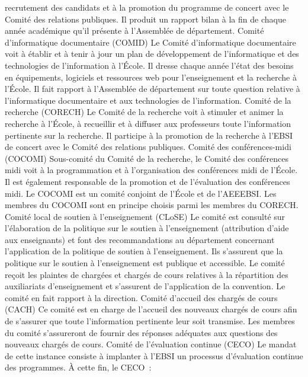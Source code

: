 \documentclass [12 pt]{article}
\begin{document}
                recrutement des candidats et à la promotion du programme de concert avec le Comité
                des relations publiques. Il produit un rapport bilan à la fin de chaque année
                académique qu'il présente à l'Assemblée de département.
            Comité d'informatique documentaire (COMID)
            Le Comité d'informatique documentaire voit à établir et à tenir à jour un plan de
                développement de l'informatique et des technologies de l'information à l'École. Il
                dresse chaque année l'état des besoins en équipements, logiciels et ressources web
                pour l'enseignement et la recherche à l'École. Il fait rapport à l'Assemblée de
                département sur toute question relative à l'informatique documentaire et aux
                technologies de l'information.
            Comité de la recherche (CORECH)
            Le Comité de la recherche voit à stimuler et animer la recherche à l'École, à
                recueillir et à diffuser aux professeurs toute l'information pertinente sur la
                recherche. Il participe à la promotion de la recherche à l'EBSI de concert avec le
                Comité des relations publiques.
            Comité des conférences-midi (COCOMI)
            Sous-comité du Comité de la recherche, le Comité des conférences midi voit à la
                programmation et à l'organisation des conférences midi de l'École. Il est également
                responsable de la promotion et de l'évaluation des conférences midi. Le COCOMI est
                un comité conjoint de l'École et de l'AEEEBSI. Les membres du COCOMI sont en
                principe choisis parmi les membres du CORECH.
            Comité local de soutien à l'enseignement (CLoSE)
            Le comité est consulté sur l'élaboration de la politique sur le soutien à
                l'enseignement (attribution d'aide aux enseignants) et font des recommandations au
                département concernant l'application de la politique de soutien à l'enseignement.
                Ils s'assurent que la politique sur le soutien à l'enseignement est publique et
                accessible. Le comité reçoit les plaintes de chargées et chargés de cours relatives
                à la répartition des auxiliariats d'enseignement et s'assurent de l'application de
                la convention. Le comité en fait rapport à la direction.
            Comité d'accueil des chargés de cours (CACH)
            Ce comité est en charge de l'accueil des nouveaux chargés de cours afin de s'assurer
                que toute l'information pertinente leur soit transmise. Les membres du comité
                s'assureront de fournir des réponses adéquates aux questions des nouveaux chargés de
                cours.
            Comité de l'évaluation continue (CECO)
            Le mandat de cette instance consiste à implanter à l'EBSI un processus d'évaluation
                continue des programmes. À cette fin, le CECO :
            
\end{document}
